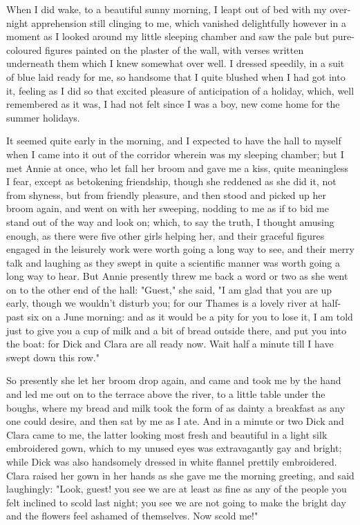 When I did wake, to a beautiful sunny morning, I leapt out of bed with
my over-night apprehension still clinging to me, which vanished
delightfully however in a moment as I looked around my little sleeping
chamber and saw the pale but pure-coloured figures painted on the
plaster of the wall, with verses written underneath them which I knew
somewhat over well. I dressed speedily, in a suit of blue laid ready for
me, so handsome that I quite blushed when I had got into it, feeling as
I did so that excited pleasure of anticipation of a holiday, which, well
remembered as it was, I had not felt since I was a boy, new come home
for the summer holidays.

It seemed quite early in the morning, and I expected to have the hall to
myself when I came into it out of the corridor wherein was my sleeping
chamber; but I met Annie at once, who let fall her broom and gave me a
kiss, quite meaningless I fear, except as betokening friendship, though
she reddened as she did it, not from shyness, but from friendly
pleasure, and then stood and picked up her broom again, and went on with
her sweeping, nodding to me as if to bid me stand out of the way and
look on; which, to say the truth, I thought amusing enough, as there
were five other girls helping her, and their graceful figures engaged in
the leisurely work were worth going a long way to see, and their merry
talk and laughing as they swept in quite a scientific manner was worth
going a long way to hear. But Annie presently threw me back a word or
two as she went on to the other end of the hall: "Guest," she said, "I
am glad that you are up early, though we wouldn't disturb you; for our
Thames is a lovely river at half-past six on a June morning: and as it
would be a pity for you to lose it, I am told just to give you a cup of
milk and a bit of bread outside there, and put you into the boat: for
Dick and Clara are all ready now. Wait half a minute till I have swept
down this row."

So presently she let her broom drop again, and came and took me by the
hand and led me out on to the terrace above the river, to a little table
under the boughs, where my bread and milk took the form of as dainty a
breakfast as any one could desire, and then sat by me as I ate. And in a
minute or two Dick and Clara came to me, the latter looking most fresh
and beautiful in a light silk embroidered gown, which to my unused eyes
was extravagantly gay and bright; while Dick was also handsomely dressed
in white flannel prettily embroidered. Clara raised her gown in her
hands as she gave me the morning greeting, and said laughingly: "Look,
guest! you see we are at least as fine as any of the people you felt
inclined to scold last night; you see we are not going to make the
bright day and the flowers feel ashamed of themselves. Now scold me!"

